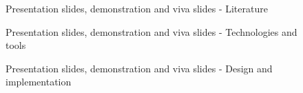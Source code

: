 \documentclass[a4paper]{article}
\begin{document}
\begin{appendices}
\begin{figure}[h!]
		\caption{Presentation slides, demonstration and viva slides - Literature}
	\end{figure}
	\begin{figure}[h!]
		\caption{Presentation slides, demonstration and viva slides - Technologies and tools}
	\end{figure}
	\newpage
	\begin{figure}[h!]
		\caption{Presentation slides, demonstration and viva slides - Design and implementation}
	\end{figure}
	\begin{figure}[h!]

\end{figure}
\end{appendices}
\end{document}

